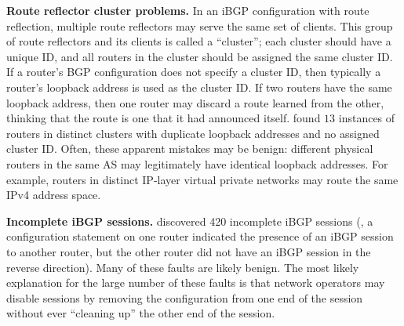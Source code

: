 {\bf Route reflector cluster problems.}  In an iBGP
configuration with route reflection, multiple route reflectors may serve
the same set of clients.  This group of route reflectors and its clients
is called a ``cluster''; each cluster should have a unique ID, and all
routers in the cluster should be assigned the same cluster ID.  If a
router's BGP configuration does not specify a cluster ID, then typically
a router's loopback address is used as the cluster ID.  If two routers
have the same loopback address, then one router may discard a route
learned from the other, thinking that the route is one that it had
announced itself.  \rcc found $13$ instances of routers in distinct clusters
with duplicate loopback addresses and no assigned cluster ID.
Often, these apparent mistakes may be benign: different physical routers
in the same AS may legitimately have identical loopback addresses.  For
example, routers in distinct IP-layer virtual private networks may route
the same IPv4 address space.


{\bf Incomplete iBGP sessions.} \rcc discovered 420 incomplete iBGP
sessions (\ie, 
a configuration statement on one router indicated the presence of an
iBGP session to another router, but the other router did not have an
iBGP session in the reverse direction).  Many of these faults are likely
benign.  The most likely explanation for the large number of
these faults is that network operators may disable sessions by removing the
configuration from one end of the session without ever ``cleaning up''
the other end of the session.



